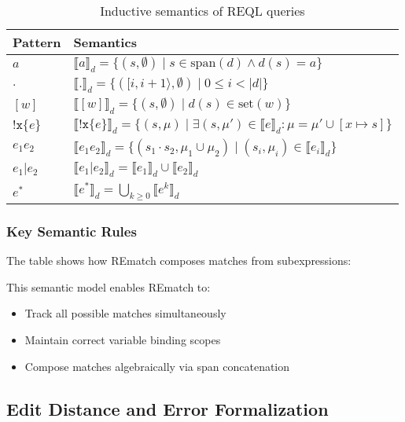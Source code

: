 \documentclass{article}
\begin{document}
\begin{table}[htbp]
\centering
\caption{Inductive semantics of REQL queries}
\label{tab:rematch-semantics}
\begin{tabular}{ll}
\toprule
\textbf{Pattern} & \textbf{Semantics} \\
\midrule
$a$ & $\llbracket a \rrbracket_d = \{(s, \emptyset) \mid s \in \text{span}(d) \land d(s) = a\}$ \\
$.$ & $\llbracket . \rrbracket_d = \{([i,i+1\rangle, \emptyset) \mid 0 \leq i < |d|\}$ \\
$[w]$ & $\llbracket [w] \rrbracket_d = \{(s, \emptyset) \mid d(s) \in \text{set}(w)\}$ \\
$\texttt{!x}\{e\}$ & $\llbracket \texttt{!x}\{e\} \rrbracket_d = \{(s, \mu) \mid \exists (s, \mu') \in \llbracket e \rrbracket_d : \mu = \mu' \cup [x \mapsto s]\}$ \\
$e_1e_2$ & $\llbracket e_1e_2 \rrbracket_d = \{(s_1 \cdot s_2, \mu_1 \cup \mu_2) \mid (s_i, \mu_i) \in \llbracket e_i \rrbracket_d\}$ \\
$e_1|e_2$ & $\llbracket e_1|e_2 \rrbracket_d = \llbracket e_1 \rrbracket_d \cup \llbracket e_2 \rrbracket_d$ \\
$e^*$ & $\llbracket e^* \rrbracket_d = \bigcup_{k\geq0} \llbracket e^k \rrbracket_d$ \\
\bottomrule
\end{tabular}
\end{table}

\subsubsection{Key Semantic Rules}
The table shows how REmatch composes matches from subexpressions:


This semantic model enables REmatch to:
\begin{itemize}
    \item Track all possible matches simultaneously
    \item Maintain correct variable binding scopes
    \item Compose matches algebraically via span concatenation
\end{itemize}

\subsection{Edit Distance and Error Formalization}
\label{sec:edit-distance}
\end{document}
